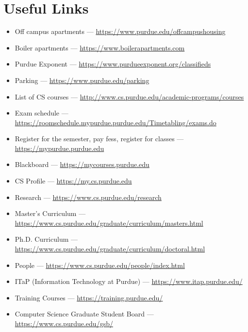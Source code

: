 \section{Useful Links}

\begin{itemize}

	\item Off campus apartments --- \url{https://www.purdue.edu/offcampushousing}

	\item Boiler apartments --- \url{https://www.boilerapartments.com}

	\item Purdue Exponent --- \url{https://www.purdueexponent.org/classifieds}

	\item Parking --- \url{https://www.purdue.edu/parking}

	\item List of CS courses --- \url{http://www.cs.purdue.edu/academic-programs/courses}

	\item Exam schedule --- \url{https://roomschedule.mypurdue.purdue.edu/Timetabling/exams.do}

	\item Register for the semester, pay fess, register for classes --- \url{https://mypurdue.purdue.edu}

	\item Blackboard --- \url{https://mycourses.purdue.edu}

	\item CS Profile --- \url{https://my.cs.purdue.edu}

	\item Research --- \url{https://www.cs.purdue.edu/research}

	\item Master's Curriculum --- \url{https://www.cs.purdue.edu/graduate/curriculum/masters.html}

	\item Ph.D. Curriculum --- \url{https://www.cs.purdue.edu/graduate/curriculum/doctoral.html}

	\item People --- \url{https://www.cs.purdue.edu/people/index.html}

	\item ITaP (Information Technology at Purdue) --- \url{https://www.itap.purdue.edu/}

	\item Training Courses --- \url{https://training.purdue.edu/}

	\item Computer Science Graduate Student Board --- \url{https://www.cs.purdue.edu/gsb/}

\end{itemize}